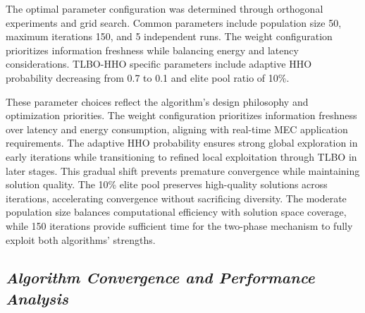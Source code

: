 \documentclass[conference]{IEEEtran}
\begin{document}
\begin{table}[!t]
  \scriptsize
  \setlength{\tabcolsep}{4pt}
  \centering
  \caption{Task Type Distribution and Characteristics}
  \label{tab:task}
\end{table}

The optimal parameter configuration was determined through orthogonal experiments and grid search. Common parameters include population size 50, maximum iterations 150, and 5 independent runs. The weight configuration prioritizes information freshness while balancing energy and latency considerations. TLBO-HHO specific parameters include adaptive HHO probability decreasing from 0.7 to 0.1 and elite pool ratio of 10\%.

These parameter choices reflect the algorithm's design philosophy and optimization priorities. The weight configuration prioritizes information freshness over latency and energy consumption, aligning with real-time MEC application requirements. The adaptive HHO probability ensures strong global exploration in early iterations while transitioning to refined local exploitation through TLBO in later stages. This gradual shift prevents premature convergence while maintaining solution quality. The 10\% elite pool preserves high-quality solutions across iterations, accelerating convergence without sacrificing diversity. The moderate population size balances computational efficiency with solution space coverage, while 150 iterations provide sufficient time for the two-phase mechanism to fully exploit both algorithms' strengths.

\subsection{\textit{Algorithm Convergence and Performance Analysis}}
\end{document}
